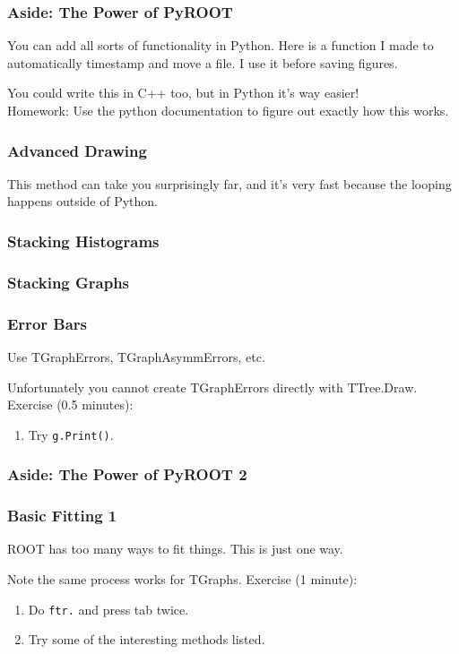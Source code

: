 \documentclass{beamer}
\begin{document}
\begin{frame}\frametitle{Aside: The Power of PyROOT}
\small{
You can add all sorts of functionality in Python.  Here is a function I made to automatically timestamp and move a file.  I use it before saving figures.

You could write this in C++ too, but in Python it's way easier!\\
Homework: Use the python documentation to figure out exactly how this works.
}
\end{frame}

\begin{frame}\frametitle{Advanced Drawing}

\small{This method can take you surprisingly far, and it's very fast because the looping happens outside of Python.}
\end{frame}

\begin{frame}\frametitle{Stacking Histograms}

\label{thstack}
\end{frame}

\begin{frame}\frametitle{Stacking Graphs}

\end{frame}


\begin{frame}\frametitle{Error Bars}
Use TGraphErrors, TGraphAsymmErrors, etc.

Unfortunately you cannot create TGraphErrors directly with TTree.Draw.
Exercise (0.5 minutes):
\begin{enumerate}
\item Try \lstinline$g.Print()$.
\end{enumerate}

\end{frame}

\begin{frame}\frametitle{Aside: The Power of PyROOT 2}

\end{frame}

\begin{frame}\frametitle{Basic Fitting 1}
ROOT has too many ways to fit things.  This is just one way.

Note the same process works for TGraphs.
Exercise (1 minute):
\begin{enumerate}
\item Do \lstinline$ftr.$ and press tab twice.
\item Try some of the interesting methods listed.
\end{enumerate}

\label{fitting1}
\end{frame}
\end{document}
